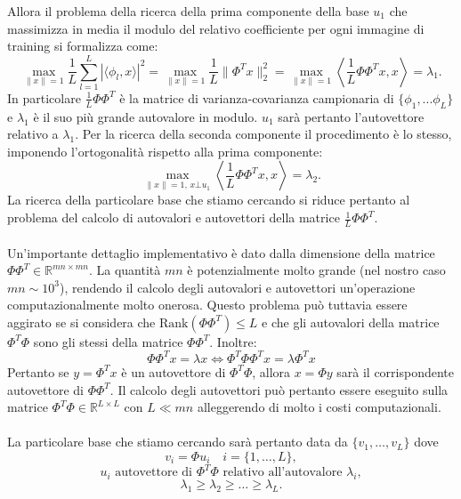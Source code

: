 Allora il problema della ricerca della prima componente della base \(u_1\) che massimizza in media il modulo del relativo coefficiente per ogni immagine di training si formalizza come:
\begin{equation}
    \max_{\| x \| = 1 } \frac{1}{L}  \sum \limits_{l=1}^{L} | \langle \phi_l, x\rangle|^2 = \max_{\| x \| = 1 } \frac{1}{L} \| \Phi^T x \| ^2_2 = \max_{\| x \| = 1 } \left\langle \frac{1}{L}\Phi \Phi^T x, x \right\rangle = \lambda_1.
\end{equation}
In particolare \(\frac{1}{L}\Phi \Phi^T\) è la matrice di varianza-covarianza campionaria di \(\{\phi_1, ... \phi_L\}\) e \(\lambda_1\) è il suo più grande autovalore in modulo. \(u_1\) sarà pertanto l'autovettore relativo a \(\lambda_1\).
Per la ricerca della seconda componente il procedimento è lo stesso, imponendo l'ortogonalità rispetto alla prima componente:
\[
    \max_{\|x\| = 1, \, x \bot u_1 } \left\langle \frac{1}{L}\Phi \Phi^T x, x \right\rangle = \lambda_2.
\]
La ricerca della particolare base che stiamo cercando si riduce pertanto al problema del calcolo di autovalori e autovettori della matrice  \(\frac{1}{L}\Phi \Phi^T\).
\\
\\
Un'importante dettaglio implementativo è dato dalla dimensione della matrice \(\Phi\Phi^T \in \mathbb{R}^{mn \times mn}\). La quantità \(mn\)  è potenzialmente molto grande (nel nostro caso \(mn \sim 10^3\)), rendendo il calcolo degli autovalori e autovettori un'operazione computazionalmente molto onerosa. Questo problema può tuttavia essere aggirato se si considera che \(\text{Rank}(\Phi\Phi^T) \leq L \) e che gli autovalori della matrice \(\Phi^T \Phi\) sono gli stessi della matrice \(\Phi \Phi^T\). Inoltre:
\[ \Phi\Phi^T x = \lambda x \iff \Phi^T \Phi \Phi^T x = \lambda \Phi^T x
    \]
Pertanto se \(y = \Phi^T x\) è un autovettore di \(\Phi^T \Phi\), allora \(x = \Phi y\) sarà il corrispondente autovettore di \( \Phi\Phi^T \). Il calcolo degli autovettori può pertanto essere eseguito sulla matrice \(\Phi^T \Phi \in \mathbb{R}^{L \times L}\) con \(L \ll mn \) alleggerendo di molto i costi computazionali.
\\
\\
La particolare base che stiamo cercando sarà pertanto data da \(\{v_1, \dots, v_L\}\) dove 
\[ v_i = \Phi u_i \quad i = \{1, \dots, L\},\]
\[u_i \text{ autovettore di } \Phi^T\Phi \text{ relativo all'autovalore } \lambda_i ,\]
\[\lambda_1 \geq \lambda_2 \geq \dots \geq \lambda_L.\]